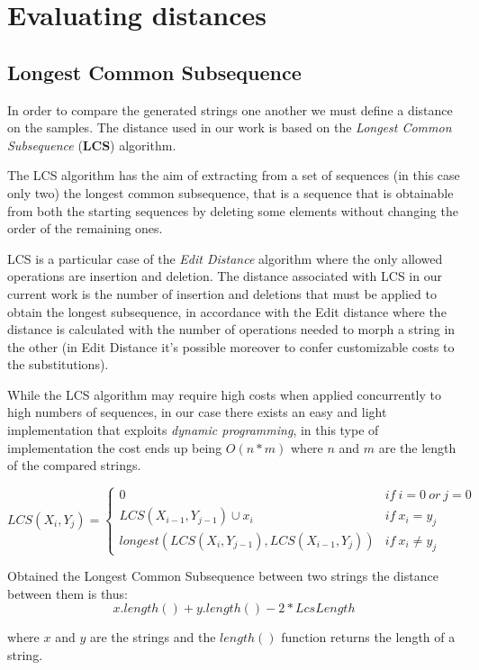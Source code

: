 \section{Evaluating distances}

\subsection{Longest Common Subsequence} 

In order to compare the generated strings one another we must define a distance on the samples.
The distance used in our work is based on the \emph{Longest Common Subsequence} (\textbf{LCS}) algorithm. 

The LCS algorithm has the aim of extracting from a set of sequences (in this case only two) the longest common subsequence, that is a sequence that is obtainable from both the starting sequences by deleting some elements without changing the order of the remaining ones.

LCS is a particular case of the \emph{Edit Distance} algorithm where the only allowed operations are insertion and deletion.
The distance associated with LCS in our current work is the number of insertion and deletions that must be applied to obtain the longest subsequence, in accordance with the Edit distance where the distance is calculated with the number of operations needed to morph a string in the other (in Edit Distance it's possible moreover to confer customizable costs to the substitutions).   

While the LCS algorithm may require high costs when applied concurrently to high numbers of sequences, in our case there exists an easy and light implementation that exploits \textit{dynamic programming}, in this type of implementation the cost ends up being $O(n*m)$ where $n$ and $m$ are the length of the compared strings.  


$$\label{LCS}
LCS(X_i,Y_j) =
 \left\{\begin{array}{ll}
 \displaystyle
 0 & if~i=0~ or~ j=0\\
 LCS(X_{i-1},Y_{j-1})\cup x_i & if~ x_i=y_j\\
 longest(LCS(X_i,Y_{j-1}), LCS(X_{i-1},Y_j)) & if~ x_i\neq y_j
 \end{array}\right.
$$


Obtained the Longest Common Subsequence between two strings the distance between them is thus:
$$ x.length() + y.length() - 2*LcsLength$$

where $x$ and $y$ are the strings and the $length()$ function returns the length of a string.

